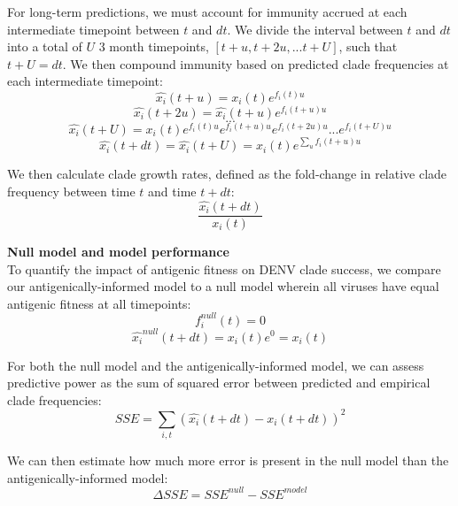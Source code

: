 \documentclass[11pt,oneside,letterpaper]{article}
\begin{document}
For long-term predictions, we must account for immunity accrued at each intermediate timepoint between $t$ and $dt$.
We divide the interval between $t$ and $dt$ into a total of $U$ 3 month timepoints, $[t+u, t+2u, ... t+U]$, such that $t+U=dt$.
We then compound immunity based on predicted clade frequencies at each intermediate timepoint:
\begin{equation}
\hat{x_i}(t+u) = x_i(t)e^{f_i(t) u}
\end{equation}
\begin{equation}
\hat{x_i}(t+2u) = \hat{x_i}(t+u) e^{f_i(t+u)u}
\end{equation}
$$...$$
\begin{equation}
\hat{x_i}(t+U) = x_i(t) e^{f_i(t)u} e^{f_i(t+u)u} e^{f_i(t+2u)u} ... e^{f_i(t+U)u}
\end{equation}
\begin{equation}
  \label{eq_compounding_immunity}
\hat{x_i}(t+dt) = \hat{x_i}(t+U) = x_i(t) e^{\sum_{u}f_i(t+u)u}
\end{equation}

We then calculate clade growth rates, defined as the fold-change in relative clade frequency between time $t$ and time $t+dt$:
\begin{equation}
  \label{eq_growth_rate}
\frac{\hat{x_i}(t+dt)}{x_i(t)}
\end{equation}

\textbf{Null model and model performance}\\
To quantify the impact of antigenic fitness on DENV clade success, we compare our antigenically-informed model to a null model wherein all viruses have equal antigenic fitness at all timepoints:
\begin{equation}
  \label{eq_null}
f_i^{null}(t) = 0
\end{equation}
\begin{equation}
\hat{x_i}^{null}(t+dt) = x_i(t) e^0 = x_i(t)
\end{equation}

For both the null model and the antigenically-informed model, we can assess predictive power as the sum of squared error between predicted and empirical clade frequencies:
\begin{equation}
  \label{eq_sse}
SSE = \sum_{i,t} \left( \hat{x_i}(t+dt) - x_{i}(t+dt) \right)^2
\end{equation}

We can then estimate how much more error is present in the null model than the antigenically-informed model:
\begin{equation}
  \label{eq_delta_sse}
\Delta SSE = SSE^{null} - SSE^{model}
\end{equation}
\end{document}
